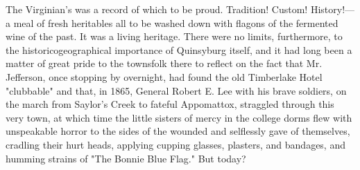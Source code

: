   The Virginian's was a record of which to be proud. Tradition! Custom!
History!---a meal of fresh heritables 
all to be washed down with flagons 
of the fermented wine of the past. It was a living heritage. There were no 
limits, furthermore, to the historicogeographical importance of Quinsyburg 
itself, and it had long been a matter of great pride to the townsfolk there to 
reflect on the fact that Mr. Jefferson, once stopping by overnight, had found 
the old Timberlake Hotel "clubbable" and that, in 1865, General Robert E. Lee 
with his brave soldiers, on the march from Saylor's Creek to fateful Appomattox,
straggled 
through this very town, at which time the little sisters of mercy in
the college dorms flew with unspeakable horror to the sides of the wounded and
selflessly gave of themselves, cradling 
their hurt heads, applying cupping glasses, plasters, and bandages, and humming 
strains of "The Bonnie Blue Flag." But today?

